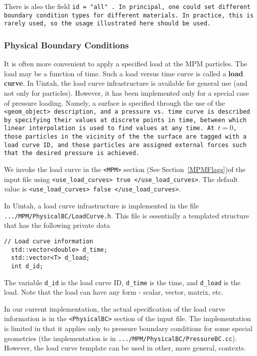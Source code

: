 There is also the field \tt id = "all" \normalfont.  In principal, one could
set different boundary condition types for different materials.  In practice,
this is rarely used, so the usage illustrated here should be used.

\subsubsection{Physical Boundary Conditions} \label{Sec:PhysicalBCs}

It is often more convenient to apply a specified load at the MPM particles.
The load may be a function of time.  Such a load versus time curve is called
a {\bf load curve}.
In Uintah, the load curve infrastructure is available for general use
(and not only for particles).  However, it has been implemented only for
a special case of pressure loading.  Namely, a surface is
specified through the use of the \tt <geom\_object> \normalfont description,
and a pressure vs. time curve is described by specifying their values
at discrete points in time, between which linear interpolation is used
to find values at any time.  At $t=0$, those particles in the vicinity
of the the surface are tagged with a load curve ID, and those particles
are assigned external forces such that the desired pressure is achieved.

We invoke the load curve in the \verb|<MPM>| section
(See Section~\ref{MPMFlags})of the input file
using  \verb|<use_load_curves> true </use_load_curves>|.  The default value
is \verb|<use_load_curves> false </use_load_curves>|.

In Uintah, a load curve infrastructure is implemented in the file \\
\verb|.../MPM/PhysicalBC/LoadCurve.h|.  This file is essentially a templated
structure that has the following private data
\begin{Verbatim}[fontsize=\footnotesize]
  // Load curve information 
  std::vector<double> d_time;
  std::vector<T> d_load;
  int d_id;
\end{Verbatim}
The variable \verb|d_id| is the load curve ID, \verb|d_time| is the time,
and \verb|d_load| is the load.  Note that the load can have any form - scalar,
vector, matrix, etc.

In our current implementation, the actual specification of the load curve
information is in the \verb|<PhysicalBC>| section of the input file.  The
implementation is limited in that it applies only to pressure boundary
conditions for some special geometries (the implementation is in
\verb|.../MPM/PhysicalBC/PressureBC.cc|).  However, the load curve template can
be used in other, more general, contexts.

